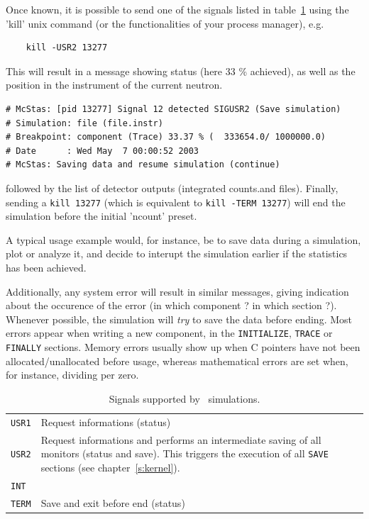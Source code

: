 Once known, it is possible to send one of the signals listed in table~\ref{t:signals} using the 'kill' unix command (or the functionalities of your process manager), e.g.
\begin{verbatim}
    kill -USR2 13277
\end{verbatim}
This will result in a message showing status (here 33 \% achieved), as well as the position in the instrument of the current neutron. 
\begin{verbatim}
# McStas: [pid 13277] Signal 12 detected SIGUSR2 (Save simulation)
# Simulation: file (file.instr)
# Breakpoint: component (Trace) 33.37 % (  333654.0/ 1000000.0)
# Date      : Wed May  7 00:00:52 2003
# McStas: Saving data and resume simulation (continue)
\end{verbatim}
followed by the list of detector outputs (integrated counts.and files). Finally, sending a \verb+kill 13277+ (which is equivalent to \verb+kill -TERM 13277+) will end the simulation before the initial 'ncount' preset.

A typical usage example would, for instance, be to save data during a simulation, plot or analyze it, and decide to interupt the simulation earlier if the statistics has been achieved.

Additionally, any system error will result in similar messages, giving indication about the occurence of the error (in which component ? in which section ?). Whenever possible, the simulation will {\em try} to save the data before ending. Most errors appear when writing a new component, in the \texttt{INITIALIZE}, \texttt{TRACE} or \texttt{FINALLY} sections. Memory errors usually show up when C pointers have not been allocated/unallocated before usage, whereas mathematical errors are set when, for instance, dividing per zero.

\begin{table}
  \begin{center}
    {\let\my=\\
    \begin{tabular}{|p{}|p{}|}
      \hline
      \texttt{USR1} & Request informations (status)  \\
      \texttt{USR2} & Request informations and performs an intermediate saving of all monitors (status and save). This triggers the execution of all \texttt{SAVE} sections (see chapter~\ref{s:kernel}).  \\
      \texttt{INT} \my \texttt{TERM} & Save and exit before end (status)  \\
      \hline
    \end{tabular}
    \caption{Signals supported by \MCS\ simulations.}
    \label{t:signals}
    }
  \end{center}
\end{table}

